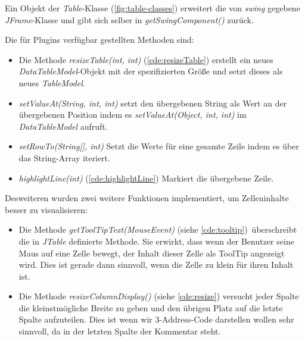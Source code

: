 Ein Objekt der \textit{Table}-Klasse (\cref{fig:table-classes}) erweitert die
von \textit{swing} gegebene \textit{JFrame}-Klasse und gibt sich selber in 
\textit{getSwingComponent()} zurück.

Die für Plugins verfügbar gestellten Methoden sind:
\begin{itemize}
  \item Die Methode \textit{resizeTable(int, int)} (\cref{cde:resizeTable}) erstellt ein neues
    \textit{DataTableModel}-Objekt mit der spezifizierten Größe und setzt dieses
    als neues \textit{TableModel}.
  \item \textit{setValueAt(String, int, int)} setzt den übergebenen String
    als Wert an der übergebenen Position indem es \textit{setValueAt(Object, int, int)}
    im \textit{DataTableModel} aufruft.
  \item \textit{setRowTo(String[], int)}
    Setzt die Werte für eine gesamte Zeile indem es über das String-Array iteriert.
  \item \textit{highlightLine(int)} (\cref{cde:highlightLine})
    Markiert die übergebene Zeile.
\end{itemize}

Desweiteren wurden zwei weitere Funktionen implementiert, um Zelleninhalte
besser zu visualisieren:\\
\begin{itemize}
  \item Die Methode \textit{getToolTipText(MouseEvent)} (siehe \cref{cde:tooltip}) überschreibt die in \textit{JTable}
    definierte Methode. Sie erwirkt, dass wenn der Benutzer seine Maus auf eine
    Zelle bewegt, der Inhalt dieser Zelle als ToolTip angezeigt wird. Dies ist gerade dann
    sinnvoll, wenn die Zelle zu klein für ihren Inhalt ist.\\
  \item Die Methode \textit{resizeColumnDisplay()} (siehe \cref{cde:resize}) versucht jeder Spalte die
    kleinstmögliche Breite zu geben und den übrigen Platz auf die letzte Spalte aufzuteilen.
    Dies ist wenn wir 3-Address-Code darstellen wollen sehr sinnvoll, da in der letzten Spalte der Kommentar steht.
\end{itemize}



\newpage
